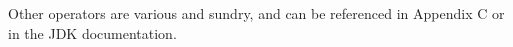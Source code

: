 Other operators are various and sundry, and can be referenced in
Appendix C or in the JDK documentation.
